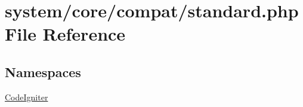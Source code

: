 \hypertarget{standard_8php}{}\section{system/core/compat/standard.php File Reference}
\label{standard_8php}
\subsection*{Namespaces}
\begin{DoxyCompactItemize}
\item 
 \mbox{\hyperlink{namespace_code_igniter}{Code\+Igniter}}
\end{DoxyCompactItemize}
